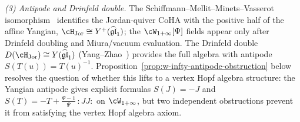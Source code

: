 \begin{remark}
\smallskip
\noindent\emph{(3) Antipode and Drinfeld double.}
The Schiffmann--Mellit--Minets--Vasserot
isomorphism~\cite{SMMV23} identifies the Jordan-quiver CoHA with the
positive half of the affine Yangian,
$\cH_{\mathrm{Jor}} \cong Y^+(\widehat{\mathfrak{gl}}_1)$; the
\(\cW_{1+\infty}[\Psi]\) fields appear only after Drinfeld doubling and
Miura/vacuum evaluation.
The Drinfeld double
$D(\cH_{\mathrm{Jor}}) \cong
Y(\widehat{\mathfrak{gl}}_1)$ (Yang--Zhao~\cite{YZ18a})
provides the full algebra with antipode
$S(T(u)) = T(u)^{-1}$.
Proposition~\ref{prop:w-infty-antipode-obstruction} below
resolves the question of whether this lifts to a
vertex Hopf algebra structure: the Yangian antipode gives
explicit formulas $S(J) = -J$ and
$S(T) = -T + \tfrac{\Psi - 1}{\Psi}\,{:}JJ{:}$ on
$\cW_{1+\infty}$, but two independent obstructions prevent
it from satisfying the vertex Hopf algebra axiom.
\end{remark}


